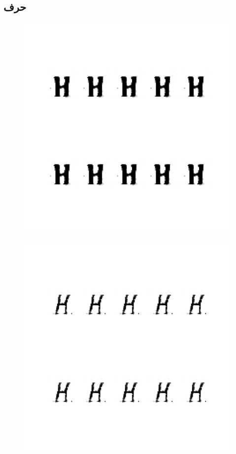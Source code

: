 \documentclass{article}
\begin{document}
\subsection{حرف }
\begin{figure}[H]
	\centerline{\includegraphics[width=\textwidth , height=\textheight ]{../results/CGAN_Adam/figs/letters/H/95.pdf}}
\end{figure}
\begin{figure}[H]
	\centerline{\includegraphics[width=\textwidth , height=\textheight ]{../results/CGAN_Adam/figs/letters/H/90.pdf}}
\end{figure}
\end{document}
